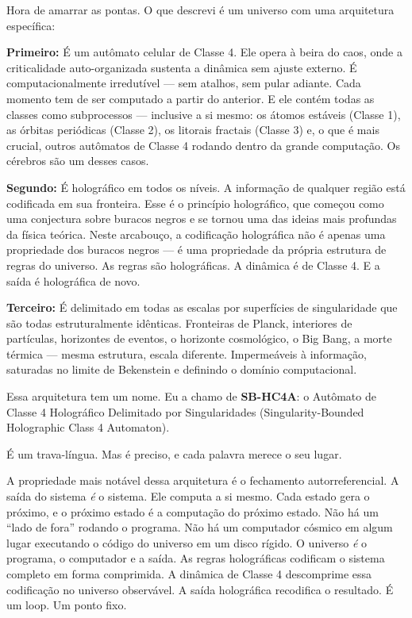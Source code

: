 \documentclass[11pt, twoside, openright]{book}
\begin{document}
Hora de amarrar as pontas. O que descrevi é um universo com uma arquitetura específica:

\textbf{Primeiro:} É um autômato celular de Classe 4. Ele opera à beira do caos, onde a criticalidade auto-organizada sustenta a dinâmica sem ajuste externo. É computacionalmente irredutível --- sem atalhos, sem pular adiante. Cada momento tem de ser computado a partir do anterior. E ele contém todas as classes como subprocessos --- inclusive a si mesmo: os átomos estáveis (Classe 1), as órbitas periódicas (Classe 2), os litorais fractais (Classe 3) e, o que é mais crucial, outros autômatos de Classe 4 rodando dentro da grande computação. Os cérebros são um desses casos.

\textbf{Segundo:} É holográfico em todos os níveis. A informação de qualquer região está codificada em sua fronteira. Esse é o princípio holográfico, que começou como uma conjectura sobre buracos negros e se tornou uma das ideias mais profundas da física teórica. Neste arcabouço, a codificação holográfica não é apenas uma propriedade dos buracos negros --- é uma propriedade da própria estrutura de regras do universo. As regras são holográficas. A dinâmica é de Classe 4. E a saída é holográfica de novo.

\textbf{Terceiro:} É delimitado em todas as escalas por superfícies de singularidade que são todas estruturalmente idênticas. Fronteiras de Planck, interiores de partículas, horizontes de eventos, o horizonte cosmológico, o Big Bang, a morte térmica --- mesma estrutura, escala diferente. Impermeáveis à informação, saturadas no limite de Bekenstein e definindo o domínio computacional.

Essa arquitetura tem um nome. Eu a chamo de \textbf{SB-HC4A}: o Autômato de Classe 4 Holográfico Delimitado por Singularidades (Singularity-Bounded Holographic Class 4 Automaton).

É um trava-língua. Mas é preciso, e cada palavra merece o seu lugar.

A propriedade mais notável dessa arquitetura é o fechamento autorreferencial. A saída do sistema \textit{é} o sistema. Ele computa a si mesmo. Cada estado gera o próximo, e o próximo estado é a computação do próximo estado. Não há um ``lado de fora'' rodando o programa. Não há um computador cósmico em algum lugar executando o código do universo em um disco rígido. O universo \textit{é} o programa, o computador e a saída. As regras holográficas codificam o sistema completo em forma comprimida. A dinâmica de Classe 4 descomprime essa codificação no universo observável. A saída holográfica recodifica o resultado. É um loop. Um ponto fixo.
\end{document}
